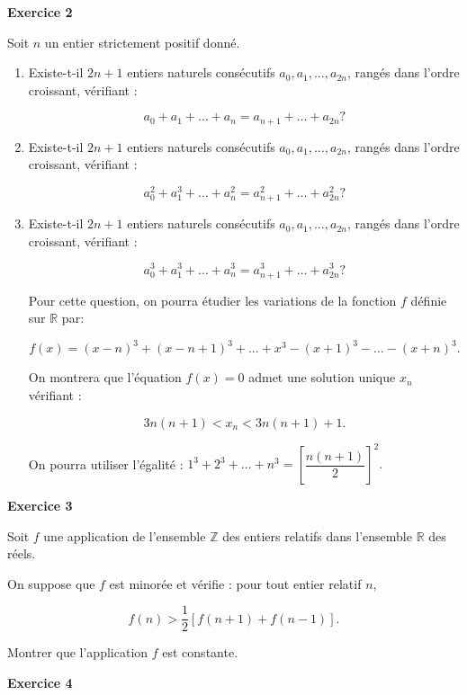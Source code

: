 \documentclass[a4paper,11pt]{article}
\newcommand{\R}{\mathbb{R}}
\newcommand{\Z}{\mathbb{Z}}
\begin{document}
\begin{center}\textbf{{\color{blue} Exercice 2}}
\end{center}

Soit $n$ un entier strictement positif donné.

\medskip

\begin{enumerate}
\item Existe-t-il $2n+ 1$ entiers naturels consécutifs $a_0, a_1, \ldots , a_{2n}$, rangés dans l'ordre croissant, vérifiant :

\[a_0 + a_1 + \ldots + a_n = a_{n+1} + \ldots + a_{2n} ?\]

\item Existe-t-il $2n+ 1$ entiers naturels consécutifs $a_0, a_1, \ldots , a_{2n}$, rangés dans l'ordre croissant, vérifiant :

\[a_0^2 + a_1^3 + \ldots + a_n^2 = a_{n+1}^2 + \ldots + a_{2n}^2 ?\]

\item Existe-t-il $2n+ 1$ entiers naturels consécutifs $a_0, a_1, \ldots , a_{2n}$, rangés dans l'ordre croissant, vérifiant :

\[a_0^3 + a_1^3 + \ldots + a_n^3 = a_{n+1}^3 + \ldots + a_{2n}^3 ?\]

Pour cette question, on pourra étudier les variations de la fonction $f$ définie sur $\R$ par:

\[f(x) = (x - n)^3+(x- n + 1)^3+ \ldots + x^3- (x+1)^3 - \ldots  - (x + n)^3.\]

On montrera que l'équation $f(x) = 0$ admet une solution unique $x_n$ vérifiant : 

\[3n(n +1) < x_n < 3n(n +1) +1.\]

On pourra utiliser l'égalité : $1^3 + 2^3 + \ldots + n^3 = \left[\dfrac{n(n+1)}{2}\right]^2.$
\end{enumerate}

\begin{center}\textbf{{\color{blue} Exercice 3}}
\end{center}

Soit $f$ une application de l'ensemble $\Z$ des entiers relatifs dans l'ensemble $\R$ des réels.

On suppose que $f$ est minorée et vérifie : pour tout entier relatif $n$,

\[f(n) > \dfrac12[f(n + 1) + f(n - 1)].\]

Montrer que l'application $f$ est constante.

\begin{center}\textbf{{\color{blue} Exercice 4}}
\end{center}
\end{document}
